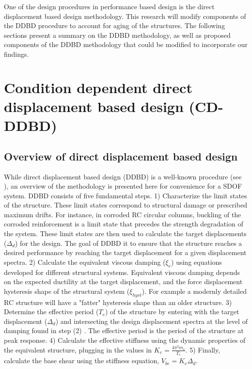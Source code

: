 One of the design procedures in performance  based design is the direct displacement based design methodology. This research will modify components of the DDBD procedure to account for aging of the structures. The following sections present a summary on the DDBD methodology, as well as proposed components of the DDBD methodology that could be modified to incorporate our findings.

\section{Condition dependent direct displacement based design (CD-DDBD)}
\subsection{Overview of direct displacement based design}

While direct displacement based design (DDBD) is a well-known procedure (see \cite{Priestley2007}), an overview of the methodology is presented here for convenience for a SDOF system. DDBD consists of five fundamental steps. 1) Characterize the limit states of the structure. These limit states correspond to structural damage or prescribed maximum drifts. For instance, in corroded RC circular columns, buckling of the corroded reinforcement is a limit state that precedes the strength degradation of the system. These limit states are then used to calculate the target displacements ($\Delta_{d}$) for the design. The goal of DDBD it to ensure that the structure reaches a desired performance by reaching the target displacement for a given displacement spectra.  2)  Calculate the equivalent viscous damping ($\xi_e$) using equations developed for different structural systems. Equivalent viscous damping depends on the expected ductility at the target displacement, and the force displacement hysteresis shape of the structural system ($\xi_{hyst}$). For example a modernly detailed RC structure will have a "fatter" hysteresis shape than an older structure. 3)  Determine the effective period ($T_e$) of the structure by entering with the target displacement ($\Delta_d$) and intersecting the design displacement spectra at the level of damping found in step (2) . The effective period is  the period of the structure at peak response. 4) Calculate the effective stiffness using the dynamic properties of the equivalent structure, plugging in the values in $K_e=\frac{4\pi^{2}m_{e}}{T_{e}}$. 5) Finally, calculate the base shear using the stiffness equation, $V_{be}=K_{e}\Delta_{d}$.

